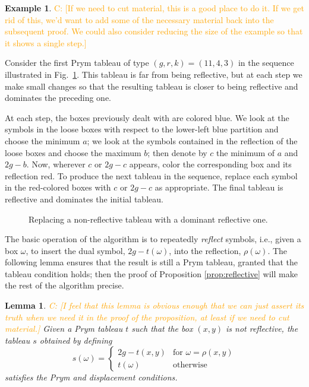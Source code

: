 \documentclass[11pt,reqno]{amsart}
\newcommand{\caelan}[1]{\textcolor{orange}{\sf C: [#1]}}
\theoremstyle{definition}
\theoremstyle{problem}
\newtheorem{example}[definition]{Example}
\theoremstyle{plain}
\newtheorem{lemma}[definition]{Lemma}
\theoremstyle{remark}
\theoremstyle{theorem}
\numberwithin{equation}{section}
\numberwithin{figure}{section}
\begin{document}
\begin{example}\label{ex:1}
  \caelan{If we need to cut material, this is a good place to do it.
    If we get rid of this, we'd want to add some of the necessary
    material back into the subsequent proof.  We could also consider
    reducing the size of the example so that it shows a single step.}
    
  Consider the first Prym tableau of type $(g,r,k)=(11,4,3)$ in the
  sequence illustrated in Fig.~\ref{fig:reflective}.  This tableau is
  far from being reflective, but at each step we make small changes so
  that the resulting tableau is closer to being reflective and
  dominates the preceding one.
  
  At each step, the boxes previously dealt with are colored blue.  We
  look at the symbols in the loose boxes with respect to the
  lower-left blue partition and choose the minimum $a$; we look at the
  symbols contained in the reflection of the loose boxes and choose
  the maximum $b$; then denote by $c$ the minimum of $a$ and $2g-b$.
  Now, wherever $c$ or $2g - c$ appears, color the corresponding box
  and its reflection red.  To produce the next tableau in the
  sequence, replace each symbol in the red-colored boxes with $c$ or
  $2g-c$ as appropriate.  The final tableau is reflective and
  dominates the initial tableau.

  \begin{figure}[htb]
    
    \caption{Replacing a non-reflective tableau with a dominant
      reflective one.}
    \label{fig:reflective}
  \end{figure}
\end{example}

The basic operation of the algorithm is to repeatedly \textit{reflect}
symbols, i.e., given a box $\omega$, to insert the dual symbol,
$2g - t(\omega)$, into the reflection, $\rho(\omega)$.  The following
lemma ensures that the result is still a Prym tableau, granted that
the tableau condition holds; then the proof of Proposition
\ref{prop:reflective} will make the rest of the algorithm precise.

\begin{lemma}\label{lem:5}
  \caelan{I feel that this lemma is obvious enough that we can just
    assert its truth when we need it in the proof of the proposition,
    at least if we need to cut material.}  Given a Prym tableau $t$
  such that the box $(x,y)$ is not reflective, the tableau $s$
  obtained by defining
  \begin{equation*}
    s(\omega) =    
    \begin{cases}
      2g - t(x,y) &\text{for } \omega = \rho(x,y) \\
      t(\omega) &\text{otherwise}
    \end{cases}
  \end{equation*}
  satisfies the Prym and displacement conditions.
\end{lemma}
\end{document}
